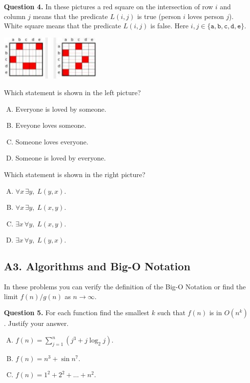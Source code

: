 \documentclass[jou]{apa6}
\begin{document}
\vspace{6pt}
{\bf Question 4.} 
In these pictures a red square on the intersection 
of row $i$ and column $j$ 
means that the predicate $L(i,j)$ is true (person $i$ 
loves person $j$). White square means that the predicate $L(i,j)$
is false. Here 
$i,j \in \{ \mathtt{a},\mathtt{b},\mathtt{c},\mathtt{d},\mathtt{e} \}$. 
\begin{center}
\includegraphics[width=2in]{midterm/predicate-grid.png}
\end{center}
Which statement is shown in the left picture?
\begin{enumerate}[(A)]
\item Everyone is loved by someone.
\item Eveyone loves someone.
\item Someone loves everyone.
\item Someone is loved by everyone.
\end{enumerate}
Which statement is shown in the right picture?
\begin{enumerate}[(A)]
\item $\forall x\, \exists y,\;L(y,x)$. 
\item $\forall x\, \exists y,\;L(x,y)$. 
\item $\exists x\, \forall y,\;L(x,y)$. 
\item $\exists x\, \forall y,\;L(y,x)$. 
\end{enumerate}






\subsection{A3. Algorithms and Big-O Notation}

In these problems you can verify the definition of the Big-O Notation 
or find the limit $f(n)/g(n)$ as $n \rightarrow \infty$. 

{\bf Question 5.} For each function find the smallest
$k$ such that $f(n)$ is in $O(n^k)$. Justify your answer.
\begin{enumerate}[(A)]
\item $f(n) = \sum_{j=1}^{n} (j^3 + j \log_2 j)$. 
\item $f(n) = n^3 + \sin n^7$. 
\item $f(n) = 1^2 + 2^2 + \ldots + n^2$.
\end{enumerate}
\end{document}
